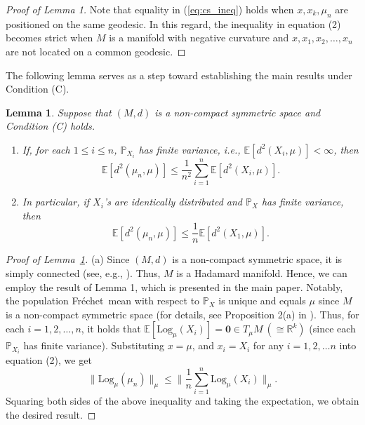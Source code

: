 \documentclass[preprint]{imsart}
\def\Frechet{Fr\'{e}chet}
\theoremstyle{plain}
\newtheorem{lemma}{Lemma}
\theoremstyle{remark}
\begin{document}
\begin{appendix}
\begin{proof}[Proof of Lemma 1]
Note that equality in (\ref{eq:cs_ineq}) holds when $x,x_k,\mu_n$ are positioned on the same geodesic. In this regard, the inequality in equation (2) becomes strict when $M$ is a manifold with negative curvature and $x, x_{1}, x_{2}, \ldots, x_{n}$ are not located on a common geodesic.
\end{proof}


The following lemma serves as a step toward establishing the main results under Condition (C). 
\begin{lemma}\label{lem:modulation_ineq} 
Suppose that $(M,d)$ is a non-compact symmetric space and Condition (C) holds.
\begin{enumerate}
    \item[(a)] If, for each $1\le i\le n$, $\mathbb{P}_{X_{i}}$ has finite variance, i.e., $\mathbb{E}[d^2(X_{i}, \mu)] < \infty$, then 
     \begin{equation}\label{ineq:mod}
        \mathbb{E}[d^2(\mu_n, \mu)]\le \frac{1}{n^2}\sum_{i=1}^{n}\mathbb{E}[d^2(X_i, \mu)].
     \end{equation}

    \item[(b)] In particular, if $X_i$'s are identically distributed and $\mathbb{P}_{X}$ has finite variance, then
    \begin{equation}\label{ineq:modulation}
        \mathbb{E}[d^2(\mu_n, \mu)]\le \frac{1}{n}\mathbb{E}[d^2(X_1, \mu)].
    \end{equation}
    \end{enumerate}
\end{lemma}


\begin{proof}[Proof of Lemma~\ref{lem:modulation_ineq}]
(a) Since $(M,d)$ is a non-compact symmetric space, it is simply connected (see, e.g., \cite{helgason1979differential}). Thus, $M$ is a Hadamard manifold. Hence, we can employ the result of Lemma 1, which is presented in the main paper. Notably, the population \Frechet\ mean with respect to $\mathbb{P}_{X}$ is unique and equals $\mu$ since $M$ is a non-compact symmetric space (for details, see Proposition 2(a) in \cite{lee2026huber}). Thus, for each $i=1, 2, \ldots, n$, it holds that $\mathbb{E}[\mbox{Log}_{\mu}(X_i)] = \textbf{0} \in T_{\mu}M ~(\cong\mathbb{R}^{k})$ (since each $\mathbb{P}_{X_i}$ has finite variance). Substituting $x=\mu$, and $x_i=X_i$ for any $i=1,2,\ldots n$ into equation (2), we get
$$
\|\mbox{Log}_{\mu}(\mu_n) \|_{\mu} \le \|\frac{1}{n}\sum_{i=1}^{n} \mbox{Log}_{\mu}(X_i) \|_{\mu}.
$$
Squaring both sides of the above inequality and taking the expectation, we obtain the desired result.



\end{proof}
\end{appendix}
\end{document}
